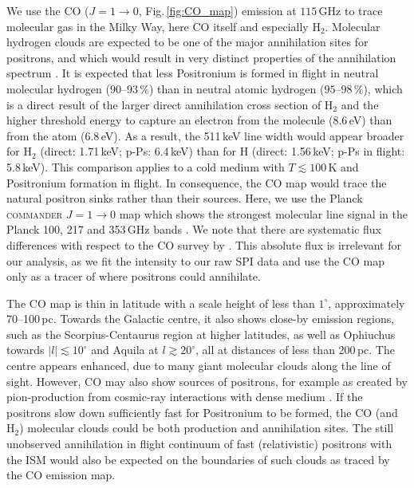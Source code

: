 \documentclass[doublespace,nopageskip]{VTthesis}
\newcommand{\mrm}[1]{\mathrm{#1}}
\begin{document}
We use the {CO} ($J=1 \rightarrow 0$, Fig.\,\ref{fig:CO_map}) emission at $115\,\mrm{GHz}$ to trace molecular gas in the Milky Way, here CO itself and especially $\mrm{H_2}$.
%
Molecular hydrogen clouds are expected to be one of the major annihilation sites for positrons, and which would result in very distinct properties of the annihilation spectrum \citep{2005A&A...436..171G}.
%
It is expected that less Positronium is formed in flight in neutral molecular hydrogen ($90$--$93\,\%$) than in neutral atomic hydrogen ($95$--$98\,\%$), which is a direct result of the larger direct annihilation cross section of $\mrm{H_2}$ and the higher threshold energy to capture an electron from the molecule (8.6\,eV) than from the atom (6.8\,eV).
%
As a result, the 511\,keV line width would appear broader for $\mrm{H_2}$ (direct: 1.71\,keV; p-Ps: 6.4\,keV) than for H (direct: 1.56\,keV; p-Ps in flight: 5.8\,keV).
%
This comparison applies to a cold medium with $T \lesssim 100\,\mrm{K}$ and Positronium formation in flight.
%
In consequence, the {CO} map would trace the natural positron sinks rather than their sources.
%
Here, we use the Planck \textsc{commander} $J=1 \rightarrow 0$ map which shows the strongest molecular line signal in the Planck 100, 217 and 353\,GHz bands \citep{2016A&A...594A..10P}.
%
We note that there are systematic flux differences with respect to the CO survey by \citet{2001ApJ...547..792D}.
%
This absolute flux is irrelevant for our analysis, as we fit the intensity to our raw SPI data and use the {CO} map only as a tracer of where positrons could annihilate.

The {CO} map is thin in latitude with a scale height of less than $1^{\circ}$, approximately 70--100\,pc.
%
Towards the Galactic centre, it also shows close-by emission regions, such as the Scorpius-Centaurus region at higher latitudes, as well as Ophiuchus towards $|l| \lesssim 10^{\circ}$ and Aquila at $l \gtrsim 20^{\circ}$, all at distances of less than 200\,pc.
%
The centre appears enhanced, due to many giant molecular clouds along the line of sight.
%
However, {CO} may also show sources of positrons, for example as created by pion-production from cosmic-ray interactions with dense medium \citep{1981SvAL....7..395A}.
%
If the positrons slow down sufficiently fast for Positronium to be formed, the {CO} (and $\mrm{H_2}$) molecular clouds could be both production and annihilation sites.
%
The still unobserved annihilation in flight continuum of fast (relativistic) positrons with the ISM \citep{2006PhRvL..97g1102B,2006PhRvD..74f3514S} would also be expected on the boundaries of such clouds as traced by the {CO} emission map. 
\end{document}
